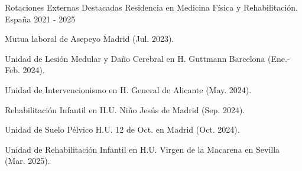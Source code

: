 \begin{cventries}
  \cventry
    {Rotaciones Externas Destacadas} %
    {Residencia en Medicina Física y Rehabilitación.} %
    {España} %
    {2021 - 2025} %
    {
      \begin{cvitems} %
        \item {Mutua laboral de Asepeyo Madrid (Jul. 2023).}
        \item {Unidad de Lesión Medular y Daño Cerebral en H. Guttmann Barcelona (Ene.-Feb. 2024).}
        \item {Unidad de Intervencionismo en H. General de Alicante (May. 2024).}
        \item {Rehabilitación Infantil en H.U. Niño Jesús de Madrid (Sep. 2024).}
        \item {Unidad de Suelo Pélvico H.U. 12 de Oct. en Madrid (Oct. 2024).}
        \item {Unidad de Rehabilitación Infantil en H.U. Virgen de la Macarena en Sevilla (Mar. 2025).}
      \end{cvitems}
    }

\end{cventries}
